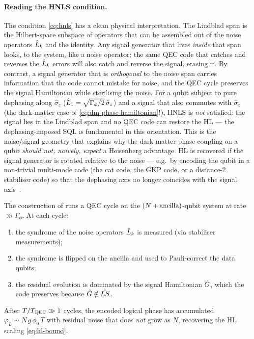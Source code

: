 \paragraph{Reading the HNLS condition.}
The condition \cref{eq:hnls} has a clean physical
interpretation. The Lindblad span is the Hilbert-space subspace
of operators that can be assembled out of the noise operators
$\hat{L}_k$ and the identity. Any signal generator that lives
\emph{inside} that span looks, to the system, like a noise
operator: the same QEC code that catches and reverses the
$\hat{L}_k$ errors will also catch and reverse the signal,
erasing it. By contrast, a signal generator that is
\emph{orthogonal} to the noise span carries information that
the code cannot mistake for noise, and the QEC cycle preserves
the signal Hamiltonian while sterilising the noise. For a
qubit subject to pure dephasing along $\hat\sigma_z$
($\hat{L}_1=\sqrt{\Gamma_\phi/2}\,\hat\sigma_z$) and a signal that
also commutes with $\hat\sigma_z$ (the dark-matter case of
\cref{eq:dm-phase-hamiltonian}!), HNLS is \emph{not}
satisfied: the signal lies in the Lindblad span and no QEC
code can restore the HL --- the dephasing-imposed SQL is
fundamental in this orientation. This is the noise/signal
geometry that explains why the dark-matter phase coupling on a
qubit \emph{should not, naively, expect} a Heisenberg
advantage. HL is recovered if the signal generator is rotated
relative to the noise --- e.g.\ by encoding the qubit in a
non-trivial multi-mode code (the cat code, the GKP code, or a
distance-2 stabiliser code) so that the dephasing axis no
longer coincides with the signal axis~\cite{kessler2014,arrad2014,dur2014,zhou2018}.

\begin{statement}
\label{stmt:qec-sensing}
The construction of \cite{zhou2018} runs a QEC cycle on
the $(N+\rm{ancilla})$-qubit system at rate $\gg \Gamma_\phi$.
At each cycle:
\begin{enumerate}
  \item the syndrome of the noise operators $\hat{L}_k$ is
        measured (via stabiliser measurements);
  \item the syndrome is flipped on the ancilla and used to
        Pauli-correct the data qubits;
  \item the residual evolution is dominated by the
        signal Hamiltonian $\hat{G}$, which the code preserves
        because $\hat{G}\notin\hat{LS}$.
\end{enumerate}
After $T/T_{\rm QEC}\gg 1$ cycles, the encoded logical phase
has accumulated $\varphi_L \sim N\,g\,\phi_0\,T$ with residual
noise that does \emph{not} grow as $N$, recovering
the HL scaling \cref{eq:hl-bound}.
\end{statement}


